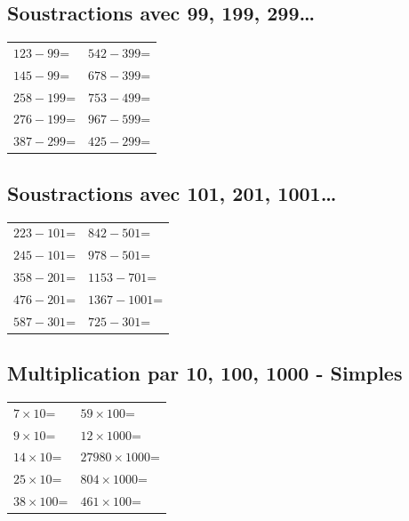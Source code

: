 \documentclass[answers]{exam}
\newcommand{\ex}[1]{#1\;=\;\dotfill}
\begin{document}
\subsection*{Soustractions avec 99, 199, 299…}
\begin{center}
\begin{tabular}{|L|L|}
\hline
\ex{$123-99$} & \ex{$542-399$} \\
\ex{$145-99$} & \ex{$678-399$} \\
\ex{$258-199$} & \ex{$753-499$} \\
\ex{$276-199$} & \ex{$967-599$} \\
\ex{$387-299$} & \ex{$425-299$} \\
\hline
\end{tabular}
\end{center}

\subsection*{Soustractions avec 101, 201, 1001…}
\begin{center}
\begin{tabular}{|L|L|}
\hline
\ex{$223-101$} & \ex{$842-501$} \\
\ex{$245-101$} & \ex{$978-501$} \\
\ex{$358-201$} & \ex{$1153-701$} \\
\ex{$476-201$} & \ex{$1367-1001$} \\
\ex{$587-301$} & \ex{$725-301$} \\
\hline
\end{tabular}
\end{center}

\subsection*{Multiplication par 10, 100, 1000 - Simples}
\begin{center}
\begin{tabular}{|L|L|}
\hline
\ex{$7\times10$} & \ex{$59\times100$} \\
\ex{$9\times10$} & \ex{$12\times1000$} \\
\ex{$14\times10$} & \ex{$27980\times1000$} \\
\ex{$25\times10$} & \ex{$804\times1000$} \\
\ex{$38\times100$} & \ex{$461\times100$} \\
\hline
\end{tabular}
\end{center}
\end{document}
